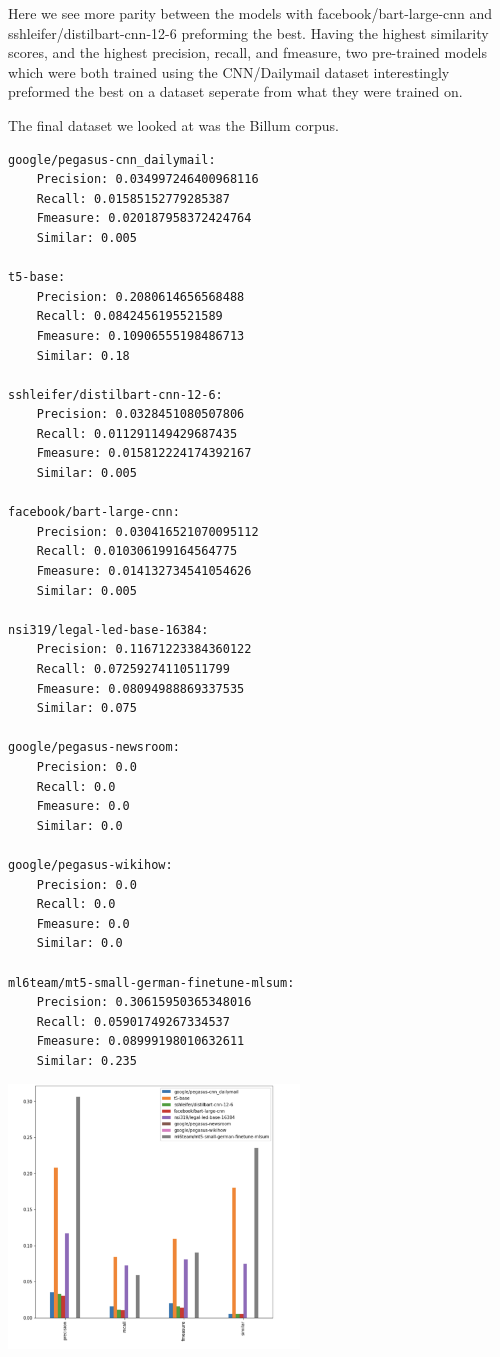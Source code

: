 \documentclass[twoside,twocolumn]{article}
\begin{document}
Here we see more parity between the models with facebook/bart-large-cnn and sshleifer/distilbart-cnn-12-6 preforming the best. Having the highest similarity scores, and the highest precision, recall, and fmeasure, two pre-trained models which were both trained using the CNN/Dailymail dataset interestingly preformed the best on a dataset seperate from what they were trained on.

The final dataset we looked at was the Billum corpus.
\begin{verbatim}
google/pegasus-cnn_dailymail:
	Precision: 0.034997246400968116
	Recall: 0.01585152779285387
	Fmeasure: 0.020187958372424764
	Similar: 0.005
	
t5-base:
	Precision: 0.2080614656568488
	Recall: 0.0842456195521589
	Fmeasure: 0.10906555198486713
	Similar: 0.18
	
sshleifer/distilbart-cnn-12-6:
	Precision: 0.0328451080507806
	Recall: 0.011291149429687435
	Fmeasure: 0.015812224174392167
	Similar: 0.005
	
facebook/bart-large-cnn:
	Precision: 0.030416521070095112
	Recall: 0.010306199164564775
	Fmeasure: 0.014132734541054626
	Similar: 0.005
	
nsi319/legal-led-base-16384:
	Precision: 0.11671223384360122
	Recall: 0.07259274110511799
	Fmeasure: 0.08094988869337535
	Similar: 0.075
	
google/pegasus-newsroom:
	Precision: 0.0
	Recall: 0.0
	Fmeasure: 0.0
	Similar: 0.0
	
google/pegasus-wikihow:
	Precision: 0.0
	Recall: 0.0
	Fmeasure: 0.0
	Similar: 0.0
	
ml6team/mt5-small-german-finetune-mlsum:
	Precision: 0.30615950365348016
	Recall: 0.05901749267334537
	Fmeasure: 0.08999198010632611
	Similar: 0.235
\end{verbatim}
\includegraphics[width=0.58\textwidth,height=0.8\textheight,keepaspectratio]{report/graph-bill.png}
\end{document}
